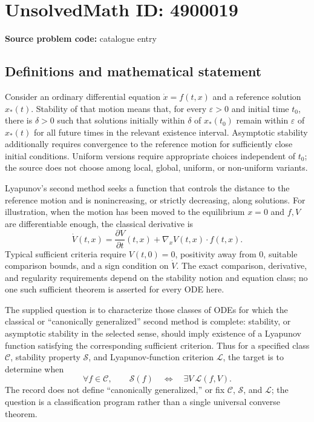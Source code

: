 \documentclass[11pt]{article}
\begin{document}
\section*{UnsolvedMath ID: 4900019}
\textbf{Source problem code:} catalogue entry
\subsection{Definitions and mathematical statement}
Consider an ordinary differential equation $\dot x=f(t,x)$ and a reference solution $x_*(t)$. Stability of that motion means that, for every $\varepsilon>0$ and initial time $t_0$, there is $\delta>0$ such that solutions initially within $\delta$ of $x_*(t_0)$ remain within $\varepsilon$ of $x_*(t)$ for all future times in the relevant existence interval. Asymptotic stability additionally requires convergence to the reference motion for sufficiently close initial conditions. Uniform versions require appropriate choices independent of $t_0$; the source does not choose among local, global, uniform, or non-uniform variants.

Lyapunov's second method seeks a function that controls the distance to the reference motion and is nonincreasing, or strictly decreasing, along solutions. For illustration, when the motion has been moved to the equilibrium $x=0$ and $f,V$ are differentiable enough, the classical derivative is
\[
 \dot V(t,x)=\frac{\partial V}{\partial t}(t,x)
          +\nabla_xV(t,x)\cdot f(t,x).
\]
Typical sufficient criteria require $V(t,0)=0$, positivity away from $0$, suitable comparison bounds, and a sign condition on $\dot V$. The exact comparison, derivative, and regularity requirements depend on the stability notion and equation class; no one such sufficient theorem is asserted for every ODE here.

The supplied question is to characterize those classes of ODEs for which the classical or ``canonically generalized'' second method is complete: stability, or asymptotic stability in the selected sense, should imply existence of a Lyapunov function satisfying the corresponding sufficient criterion. Thus for a specified class $\mathcal C$, stability property $\mathcal S$, and Lyapunov-function criterion $\mathcal L$, the target is to determine when
\[
 \forall f\in\mathcal C,\qquad
 \mathcal S(f)\quad\Longleftrightarrow\quad
 \exists V\ \mathcal L(f,V).
\]
The record does not define ``canonically generalized,'' or fix $\mathcal C$, $\mathcal S$, and $\mathcal L$; the question is a classification program rather than a single universal converse theorem.
\end{document}
